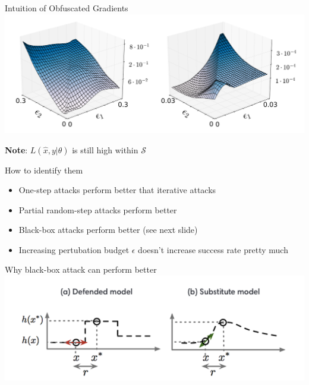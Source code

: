 \documentclass{beamer}
\begin{document}
\begin{frame}{Intuition of Obfuscated Gradients}
  \includegraphics[width=\textwidth]{fig/ob-grad/effect-of-gradient-masking.png}

  \textbf{Note}: $L(\hat{x},y|\theta)$ is still high within $\mathcal{S}$
\end{frame}

\begin{frame}{How to identify them}
  \begin{itemize}
    \item One-step attacks perform better that iterative attacks
    \item Partial random-step attacks perform better
    \item Black-box attacks perform better (see next slide)
    \item Increasing pertubation budget $\epsilon$ doesn't increase success rate pretty much
  \end{itemize}
\end{frame}

\begin{frame}{Why black-box attack can perform better}
  \includegraphics[width=\textwidth]{fig/ob-grad/black-box-attack.png}
\end{frame}
\end{document}
